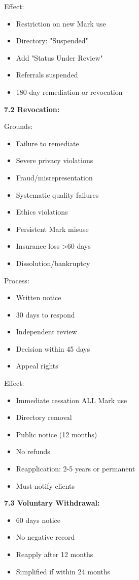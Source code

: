 \documentclass[11pt,a4paper]{article}
\begin{document}
Effect:
\begin{itemize}
\item Restriction on new Mark use
\item Directory: "Suspended"
\item Add "Status Under Review"
\item Referrals suspended
\item 180-day remediation or revocation
\end{itemize}

\textbf{7.2 Revocation:}

Grounds:
\begin{itemize}
\item Failure to remediate
\item Severe privacy violations
\item Fraud/misrepresentation
\item Systematic quality failures
\item Ethics violations
\item Persistent Mark misuse
\item Insurance loss >60 days
\item Dissolution/bankruptcy
\end{itemize}

Process:
\begin{itemize}
\item Written notice
\item 30 days to respond
\item Independent review
\item Decision within 45 days
\item Appeal rights
\end{itemize}

Effect:
\begin{itemize}
\item Immediate cessation ALL Mark use
\item Directory removal
\item Public notice (12 months)
\item No refunds
\item Reapplication: 2-5 years or permanent
\item Must notify clients
\end{itemize}

\textbf{7.3 Voluntary Withdrawal:}
\begin{itemize}
\item 60 days notice
\item No negative record
\item Reapply after 12 months
\item Simplified if within 24 months
\end{itemize}
\end{document}
